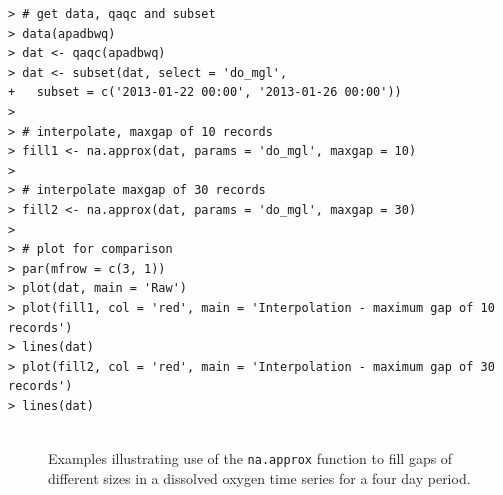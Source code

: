 \documentclass[10pt,letterpaper]{article}\usepackage[]{graphicx}\usepackage[]{color}
\makeatletter
\newenvironment{kframe}{%
 \def\at@end@of@kframe{}%
 \ifinner\ifhmode%
  \def\at@end@of@kframe{\end{minipage}}%
  \begin{minipage}{\columnwidth}%
 \fi\fi%
 \def\FrameCommand##1{\hskip\@totalleftmargin \hskip-\fboxsep
 \colorbox{shadecolor}{##1}\hskip-\fboxsep
     \hskip-\linewidth \hskip-\@totalleftmargin \hskip\columnwidth}%
 \MakeFramed {\advance\hsize-\width
   \@totalleftmargin\z@ \linewidth\hsize
   \@setminipage}}%
 {\par\unskip\endMakeFramed%
 \at@end@of@kframe}
\newenvironment{knitrout}{}{} %
\makeatother
\begin{document}
\begin{knitrout}\small
{}\color{fgcolor}\begin{kframe}
\begin{verbatim}
> # get data, qaqc and subset
> data(apadbwq)
> dat <- qaqc(apadbwq)
> dat <- subset(dat, select = 'do_mgl', 
+   subset = c('2013-01-22 00:00', '2013-01-26 00:00'))
> 
> # interpolate, maxgap of 10 records
> fill1 <- na.approx(dat, params = 'do_mgl', maxgap = 10)
> 
> # interpolate maxgap of 30 records
> fill2 <- na.approx(dat, params = 'do_mgl', maxgap = 30)
> 
> # plot for comparison
> par(mfrow = c(3, 1))
> plot(dat, main = 'Raw')
> plot(fill1, col = 'red', main = 'Interpolation - maximum gap of 10 records')
> lines(dat)
> plot(fill2, col = 'red', main = 'Interpolation - maximum gap of 30 records')
> lines(dat)
\end{verbatim}
\end{kframe}\begin{figure}[!h]

{\centering \includegraphics[width=0.00\textwidth]{figure/interp_ex-1} 

}

\caption[Examples illustrating use of the \texttt{na.approx} function to fill gaps of different sizes in a dissolved oxygen time series for a four day period.]{Examples illustrating use of the \texttt{na.approx} function to fill gaps of different sizes in a dissolved oxygen time series for a four day period.}\label{fig:interp_ex}
\end{figure}


\end{knitrout}
\end{document}
